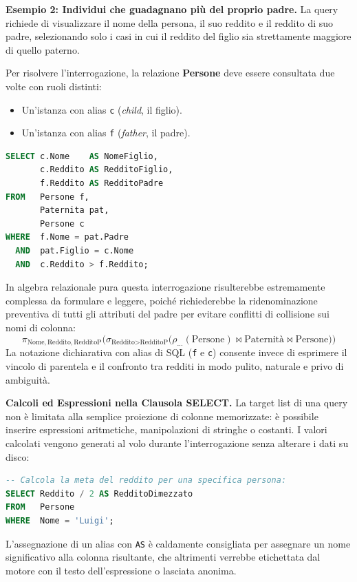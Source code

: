 \documentclass[12pt]{extarticle}
\begin{document}
\medskip
\noindent \textbf{Esempio 2: Individui che guadagnano più del proprio padre.}
La query richiede di visualizzare il nome della persona, il suo reddito e il reddito di suo padre, selezionando solo i casi in cui il reddito del figlio sia strettamente maggiore di quello paterno. 

\medskip
\noindent Per risolvere l'interrogazione, la relazione \textbf{Persone} deve essere consultata due volte con ruoli distinti:
\begin{itemize}
    \item Un'istanza con alias \texttt{c} (\textit{child}, il figlio).
    \item Un'istanza con alias \texttt{f} (\textit{father}, il padre).
\end{itemize}

\begin{lstlisting}[language=SQL]
SELECT c.Nome    AS NomeFiglio,
       c.Reddito AS RedditoFiglio,
       f.Reddito AS RedditoPadre
FROM   Persone f,
       Paternita pat,
       Persone c
WHERE  f.Nome = pat.Padre
  AND  pat.Figlio = c.Nome
  AND  c.Reddito > f.Reddito;
\end{lstlisting}

\medskip
\noindent In algebra relazionale pura questa interrogazione risulterebbe estremamente complessa da formulare e leggere, poiché richiederebbe la ridenominazione preventiva di tutti gli attributi del padre per evitare conflitti di collisione sui nomi di colonna:
\[
\pi_{\text{Nome}, \text{Reddito}, \text{RedditoP}}\Big(\sigma_{\text{Reddito} > \text{RedditoP}}\big(\rho_{\dots}(\text{Persone}) \bowtie \text{Paternità} \bowtie \text{Persone}\big)\Big)
\]
La notazione dichiarativa con alias di SQL (\texttt{f} e \texttt{c}) consente invece di esprimere il vincolo di parentela e il confronto tra redditi in modo pulito, naturale e privo di ambiguità.

\noindent \textbf{Calcoli ed Espressioni nella Clausola SELECT.} La target list di una query non è limitata alla semplice proiezione di colonne memorizzate: è possibile inserire espressioni aritmetiche, manipolazioni di stringhe o costanti. I valori calcolati vengono generati al volo durante l'interrogazione senza alterare i dati su disco:

\begin{lstlisting}[language=SQL]
-- Calcola la meta del reddito per una specifica persona:
SELECT Reddito / 2 AS RedditoDimezzato
FROM   Persone
WHERE  Nome = 'Luigi';
\end{lstlisting}
L'assegnazione di un alias con \texttt{AS} è caldamente consigliata per assegnare un nome significativo alla colonna risultante, che altrimenti verrebbe etichettata dal motore con il testo dell'espressione o lasciata anonima.
\end{document}
